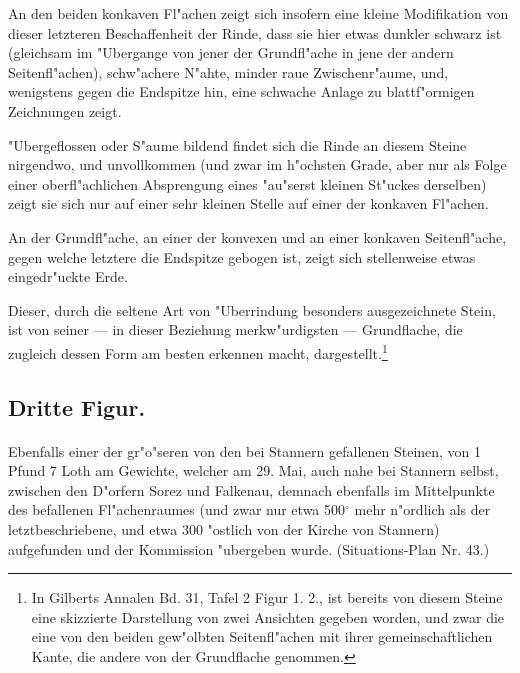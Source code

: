 \documentclass[a4paper, 11pt, oneside, german]{article}
\begin{document}
An den beiden konkaven Fl"achen zeigt sich insofern eine kleine Modifikation von dieser letzteren Beschaffenheit der Rinde, dass sie hier etwas dunkler schwarz ist (gleichsam im "Ubergange von jener der Grundfl"ache in jene der andern Seitenfl"achen), schw"achere N"ahte, minder raue Zwischenr"aume, und, wenigstens gegen die Endspitze hin, eine schwache Anlage zu blattf"ormigen Zeichnungen zeigt.

"Ubergeflossen oder S"aume bildend findet sich die Rinde an diesem Steine nirgendwo, und unvollkommen (und zwar im h"ochsten Grade, aber nur als Folge einer oberfl"achlichen Absprengung eines "au"serst kleinen St"uckes derselben) zeigt sie sich nur auf einer sehr kleinen Stelle auf einer der konkaven Fl"achen.

An der Grundfl"ache, an einer der konvexen und an einer konkaven Seitenfl"ache, gegen welche letztere die Endspitze gebogen ist, zeigt sich stellenweise etwas eingedr"uckte Erde.

Dieser, durch die seltene Art von "Uberrindung besonders ausgezeichnete Stein, ist von seiner --- in dieser Beziehung merkw"urdigsten --- Grundflache, die zugleich dessen Form am besten erkennen macht, dargestellt.\footnote{In Gilberts Annalen Bd. 31, Tafel 2 Figur 1. 2., ist bereits von diesem Steine eine skizzierte Darstellung von zwei Ansichten gegeben worden, und zwar die eine von den beiden gew"olbten Seitenfl"achen mit ihrer gemeinschaftlichen Kante, die andere von der Grundflache genommen.}

\subsection{Dritte Figur.}
\paragraph{}
Ebenfalls einer der gr"o"seren von den bei Stannern gefallenen Steinen, von 1 Pfund 7 Loth am Gewichte, welcher am 29. Mai, auch nahe bei Stannern selbst, zwischen den D"orfern Sorez und Falkenau, demnach ebenfalls im Mittelpunkte des befallenen Fl"achenraumes (und zwar nur etwa 500$^{\circ}$ mehr n"ordlich als der letztbeschriebene, und etwa 300 "ostlich von der Kirche von Stannern) aufgefunden und der Kommission "ubergeben wurde. (Situations-Plan Nr. 43.)
\end{document}
